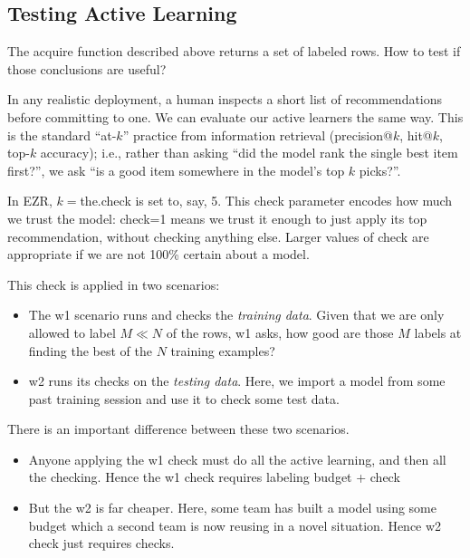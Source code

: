 \documentclass[AMA,STIX2COL]{WileyNJDv5}
\begin{document}
{ 
 \subsection{Testing Active Learning}
The \textsf{acquire} function described above returns a set of labeled
rows. How to test if those conclusions are useful? 

In any realistic 
deployment, a human inspects a short list of recommendations before 
committing to one.
We can evaluate our active learners the same way. This is the standard 
``at-$k$'' practice from information retrieval (precision@$k$, 
hit@$k$, top-$k$ accuracy);
i.e., rather than asking ``did the model rank 
the single best item first?'', we ask ``is a good item somewhere in 
the model's top $k$ picks?''.

In EZR,  $k=$\textsf{the.check} is set to, say, 5.
This \textsf{check} parameter  encodes how much we trust the model: 
\textsf{check}=1 means we trust it enough to just apply its
top recommendation, without checking anything else.
Larger 
values of \textsf{check} are appropriate if we are not 100\% certain about a model.

This  \textsf{check}  is applied in two scenarios:
\begin{itemize}
\item
The \textsf{w1} scenario runs and checks the {\em training data}.
 Given that  we are only allowed to label $M\ll N$ of the rows,
 \textsf{w1} asks,   how good are those $M$ labels at finding the best of the $N$ training
examples? 
\item
\textsf{w2} runs its checks on the {\em testing data}.
Here, we import a model from some past training session and use it
to check some test data. 
\end{itemize}
There is an important difference between these two scenarios.
\begin{itemize}
\item
 Anyone applying the
\textsf{w1} check must do all the active learning, and then all the checking. 
Hence   the \textsf{w1} check requires labeling \textsf{budget}  +  \textsf{check} 
\item
But the \textsf{w2} is far cheaper. Here, some   team has built a model
using some \textsf{budget} which a second team
is  now reusing in a novel situation.
Hence     \textsf{w2} check   just   requires \textsf{check}s.
\end{itemize}
 

}
\end{document}
